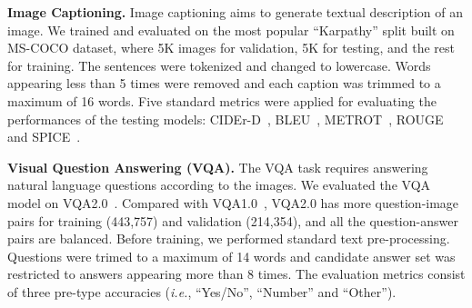\documentclass[10pt,twocolumn,letterpaper]{article}
\newcommand\ies{\textit{i.e.}}
\begin{document}
\begin{table}[]
\centering
{}
\caption{Hallucination analysis~\cite{rohrbach2018object} of various models on MS-COCO Karpathy test split to measure object hallucination for image captioning. The lower, the better.}
\label{tab:bias}
\vspace{-0.4cm}
\end{table}






\noindent\textbf{Image Captioning.}
Image captioning aims to generate textual description of an image.
We trained and evaluated on the most popular ``Karpathy'' split built on MS-COCO dataset, where 5K images for validation, 5K for testing, and the rest for training.
The sentences were tokenized and changed to lowercase.
Words appearing less than 5 times were removed and each caption was trimmed to a maximum of 16 words.
Five standard metrics were applied for evaluating the performances of the testing models: CIDEr-D~\cite{vedantam2015cider}, BLEU~\cite{papineni2002bleu}, METROT~\cite{banerjee2005meteor}, ROUGE~\cite{lin2004rouge} and SPICE~\cite{anderson2016spice}.


\noindent\textbf{Visual Question Answering (VQA).}
The VQA task requires answering natural language questions according to the images.
We evaluated the VQA model on VQA2.0~\cite{goyal2017making}. 
Compared with VQA1.0~\cite{antol2015vqa}, VQA2.0 has more question-image pairs for training (443,757) and validation (214,354), and all the question-answer pairs are balanced.
Before training, we performed standard text pre-processing.
Questions were trimed to a maximum of 14 words and candidate answer set was restricted to answers appearing more than 8 times.
The evaluation metrics consist of three pre-type accuracies (\ies, ``Yes/No'', ``Number'' and ``Other'').
\end{document}
